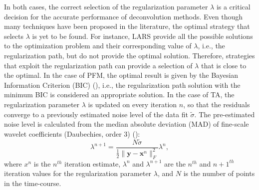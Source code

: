 In both cases, the correct selection of the regularization parameter $\lambda$ is a critical decision for the accurate performance of deconvolution methods. Even though many techniques have been proposed in the literature, the optimal strategy that selects $\lambda$ is yet to be found. For instance, LARS provide all the possible solutions to the optimization problem and their corresponding value of $\lambda$, i.e., the regularization path, but do not provide the optimal solution. Therefore, strategies that exploit the regularization path can provide a selection of $\lambda$ that is close to the optimal. In the case of PFM, the optimal result is given by the Bayesian Information Criterion (BIC) (\citealt{schwarz1978EstimatingDimensionModel}), i.e., the regularization path solution with the minimum BIC is considered an appropriate solution. In the case of TA, the regularization parameter $\lambda$ is updated on every iteration $n$, so that the residuals converge to a previously estimated noise level of the data fit $\tilde{\sigma}$. The pre-estimated noise level is calculated from the median absolute deviation (MAD) of fine-scale wavelet coefficients (Daubechies, order 3) (\citealt{karahanoglu2013TotalActivationfMRI}):
\begin{equation}
    \lambda^{n+1} = \frac{N \tilde{\sigma}}{\frac{1}{2} \| \mathbf{y} - \mathbf{x}^n \|_F^2} \lambda^n,
\label{eq:std}
\end{equation}
where $x^n$ is the $n^{th}$ iteration estimate, $\lambda^n$ and $\lambda^{n+1}$ are the $n^{th}$ and $n+1^{th}$ iteration values for the regularization parameter $\lambda$, and $N$ is the number of points in the time-course.

